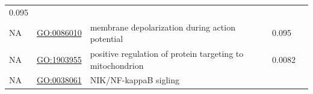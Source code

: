 \documentclass[
]{article}
\begin{document}
\begin{longtable}[]{@{}lllll@{}}
\begin{minipage}[t]{0.17\columnwidth}
0.095\strut
\end{minipage} & \begin{minipage}[t]{0.17\columnwidth}\raggedright
\strut
\end{minipage}\tabularnewline
\begin{minipage}[t]{0.17\columnwidth}\raggedright
NA\strut
\end{minipage} & \begin{minipage}[t]{0.17\columnwidth}\raggedright
\url{GO:0086010}\strut
\end{minipage} & \begin{minipage}[t]{0.17\columnwidth}\raggedright
membrane depolarization during action potential\strut
\end{minipage} & \begin{minipage}[t]{0.17\columnwidth}\raggedright
0.095\strut
\end{minipage} & \begin{minipage}[t]{0.17\columnwidth}\raggedright
\strut
\end{minipage}\tabularnewline
\begin{minipage}[t]{0.17\columnwidth}\raggedright
NA\strut
\end{minipage} & \begin{minipage}[t]{0.17\columnwidth}\raggedright
\url{GO:1903955}\strut
\end{minipage} & \begin{minipage}[t]{0.17\columnwidth}\raggedright
positive regulation of protein targeting to mitochondrion\strut
\end{minipage} & \begin{minipage}[t]{0.17\columnwidth}\raggedright
0.0082\strut
\end{minipage} & \begin{minipage}[t]{0.17\columnwidth}\raggedright
\strut
\end{minipage}\tabularnewline
\begin{minipage}[t]{0.17\columnwidth}\raggedright
NA\strut
\end{minipage} & \begin{minipage}[t]{0.17\columnwidth}\raggedright
\url{GO:0038061}\strut
\end{minipage} & \begin{minipage}[t]{0.17\columnwidth}\raggedright
NIK/NF-kappaB sigling\strut
\end{minipage} & \begin{minipage}[t]{0.17\columnwidth}\raggedright
\strut
\end{minipage} & \begin{minipage}[t]{0.17\columnwidth}\raggedright

\end{minipage}
\end{longtable}
\end{document}
